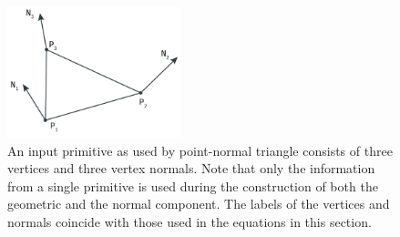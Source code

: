 \begin{figure}
	\centering
	\includegraphics[width=0.45\textwidth]{./content/img/method/input.png}
	\caption{An input primitive as used by point-normal triangle consists of three vertices and three vertex normals. Note that only the information from a single primitive is used during the construction of both the geometric and the normal component. The labels of the vertices and normals coincide with those used in the equations in this section.}
	\label{fig:method:input_primitive}
\end{figure}




